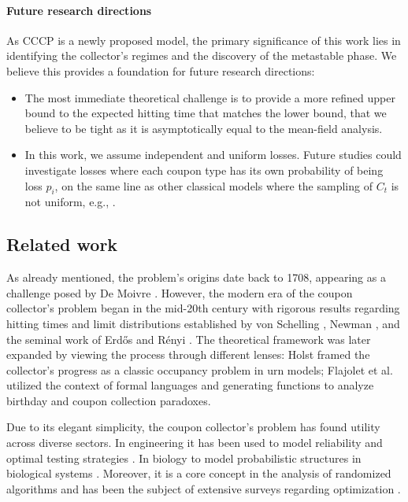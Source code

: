 \documentclass[11pt,a4paper]{article}
\begin{document}
\paragraph*{Future research directions}
As CCCP is a newly proposed model, the primary significance of this work lies in identifying the collector's regimes and the discovery of the metastable phase. We believe this provides a foundation for future research directions:
\begin{itemize}
    \item The most immediate theoretical challenge is to provide a more refined upper bound to the expected hitting time that matches the lower bound, that we believe to be tight as it is asymptotically equal to the mean-field analysis.
    \item In this work, we assume independent and uniform losses. Future studies could investigate losses where each coupon type has its own probability of being loss $p_i$, on the same line as other classical models where the sampling of $C_t$ is not uniform, e.g., \cite{flajolet1992birthday}.
\end{itemize}



\subsection{Related work}\label{sec:related}

As already mentioned, the problem's origins date back to 1708, appearing as a challenge posed by De Moivre \cite{ferrante2014coupon}. 
However, the modern era of the coupon collector's problem began in the mid-20th century with rigorous results regarding hitting times and limit distributions established by von Schelling \cite{von1954coupon}, Newman \cite{newman1960double}, and the seminal work of Erdős and Rényi \cite{erdHos1961classical}.
The theoretical framework was later expanded by viewing the process through different lenses: 
Holst \cite{holst1986birthday} framed the collector's progress as a classic occupancy problem in urn models;
Flajolet et al. \cite{flajolet1992birthday} utilized the context of formal languages and generating functions to analyze birthday and coupon collection paradoxes.

Due to its elegant simplicity, the coupon collector's problem has found utility across diverse sectors.
In engineering it has been used to model reliability and optimal testing strategies \cite{luko2009coupon, dobson2015optimal}. 
In biology to model probabilistic structures in biological systems \cite{adler2005probabilistic}.
Moreover, it is a core concept in the analysis of randomized algorithms \cite{raghavan1995randomized, mitzenmacher2017probability} and has been the subject of extensive surveys regarding optimization \cite{boneh1997coupon}.
\end{document}
